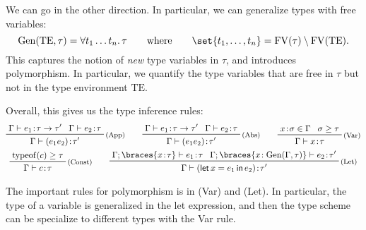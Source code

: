 \documentclass[class=scrartcl]{standalone}
\begin{document}
We can go in the other direction.
In particular, we can generalize types with free variables:
\[
  \operatorname{Gen}(\mathrm{TE}, \tau)
    = \forall t_1 \dots t_n.\, \tau
  \qquad \text{where} \qquad
  \set{t_1, \dots, t_n}
    = \operatorname{FV}(\tau) \setminus \operatorname{FV}(\mathrm{TE}).
\]
This captures the notion of \emph{new} type variables in \(\tau\),
and introduces polymorphism.
In particular, we quantify the type variables that are free in \(\tau\)
but not in the type environment \(\mathrm{TE}\).

Overall, this gives us the type inference rules:
\begin{gather*}
  \prftree[r]{\footnotesize (App)}
          {\Gamma \vdash e_1 \of \tau \to \tau'}
          {\Gamma \vdash e_2 \of \tau}
          {\Gamma \vdash (e_1 e_2) \of \tau'} \qquad
  \prftree[r]{\footnotesize (Abs)}
          {\Gamma \vdash e_1 \of \tau \to \tau'}
          {\Gamma \vdash e_2 \of \tau}
          {\Gamma \vdash (e_1 e_2) \of \tau'} \qquad
  \prftree[r]{\footnotesize (Var)}
          {x \of \sigma \in \Gamma}
          {\sigma \geq \tau}
          {\Gamma \vdash x \of \tau} \\
  \prftree[r]{\footnotesize (Const)}
          {\operatorname{typeof}(c) \geq \tau}
          {\Gamma \vdash c \of \tau} \qquad
  \prftree[r]{\footnotesize (Let)}
          {\Gamma; \braces{x \of \tau} \vdash e_1 \of \tau}
          {\Gamma; \braces{x \of \operatorname{Gen}(\Gamma, \tau)}
            \vdash e_2 \of \tau'}
          {\Gamma \vdash (\pletin{x = e_1}{e_2}) \of \tau'}
\end{gather*}

The important rules for polymorphism is in (Var) and (Let).
In particular, the type of a variable is generalized in the let expression,
and then the type scheme can be specialize to different types with the Var rule.
\end{document}
